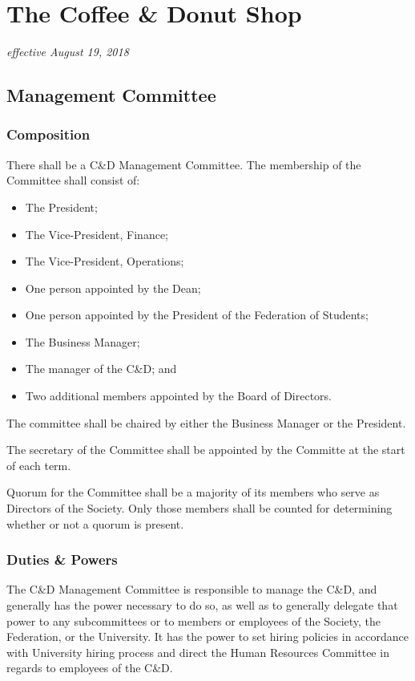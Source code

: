 \section{The Coffee \& Donut Shop}
\emph{effective August 19, 2018}

\subsection{Management Committee}
\subsubsection{Composition}
There shall be a C\&D Management Committee. The membership of the Committee shall
consist of:
\begin{itemize}
    \item The President;
    \item The Vice-President, Finance;
    \item The Vice-President, Operations;
    \item One person appointed by the Dean;
    \item One person appointed by the President of
        the Federation of Students; 
    \item The Business Manager;
    \item The manager of the C\&D; and
    \item Two additional members appointed by the Board of Directors.
\end{itemize}

The committee shall be chaired by either the Business Manager or the President.

The secretary of the Committee shall be appointed by the Committe at the start
of each term.

Quorum for the Committee shall be a majority of its members who serve as
Directors of the Society. Only those members shall be counted for determining
whether or not a quorum is present.

\subsubsection{Duties \& Powers}
The C\&D Management Committee is responsible to manage the C\&D, and generally
has the power necessary to do so, as well as to generally delegate that power
to any subcommittees or to members or employees of the Society, the Federation,
or the University. It has the power to set hiring policies in accordance with
University hiring process and direct the Human Resources Committee in regards
to employees of the C\&D.

